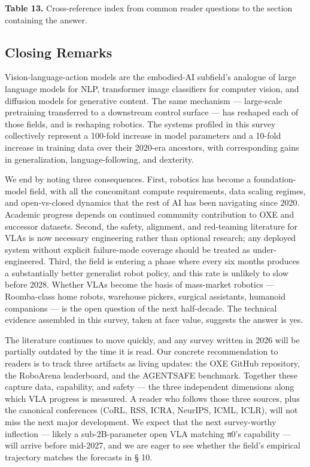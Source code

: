 \documentclass{article}
\begin{document}
\textbf{Table 13.} Cross-reference index from common reader questions to the section containing the answer.

\subsection{Closing Remarks}\label{closing-remarks}

Vision-language-action models are the embodied-AI subfield's analogue of large language models for NLP, transformer image classifiers for computer vision, and diffusion models for generative content. The same mechanism --- large-scale pretraining transferred to a downstream control surface --- has reshaped each of those fields, and is reshaping robotics. The systems profiled in this survey collectively represent a 100-fold increase in model parameters and a 10-fold increase in training data over their 2020-era ancestors, with corresponding gains in generalization, language-following, and dexterity.

We end by noting three consequences. First, robotics has become a foundation-model field, with all the concomitant compute requirements, data scaling regimes, and open-vs-closed dynamics that the rest of AI has been navigating since 2020. Academic progress depends on continued community contribution to OXE and successor datasets. Second, the safety, alignment, and red-teaming literature for VLAs is now necessary engineering rather than optional research; any deployed system without explicit failure-mode coverage should be treated as under-engineered. Third, the field is entering a phase where every six months produces a substantially better generalist robot policy, and this rate is unlikely to slow before 2028. Whether VLAs become the basis of mass-market robotics --- Roomba-class home robots, warehouse pickers, surgical assistants, humanoid companions --- is the open question of the next half-decade. The technical evidence assembled in this survey, taken at face value, suggests the answer is yes.

The literature continues to move quickly, and any survey written in 2026 will be partially outdated by the time it is read. Our concrete recommendation to readers is to track three artifacts as living updates: the OXE GitHub repository, the RoboArena leaderboard, and the AGENTSAFE benchmark. Together these capture data, capability, and safety --- the three independent dimensions along which VLA progress is measured. A reader who follows those three sources, plus the canonical conferences (CoRL, RSS, ICRA, NeurIPS, ICML, ICLR), will not miss the next major development. We expect that the next survey-worthy inflection --- likely a sub-2B-parameter open VLA matching π0's capability --- will arrive before mid-2027, and we are eager to see whether the field's empirical trajectory matches the forecasts in § 10.
\end{document}
